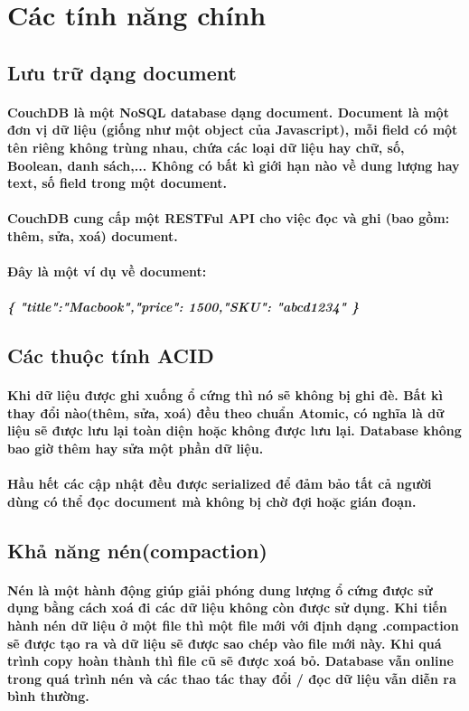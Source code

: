 	 \section{Các tính năng chính}
	  	\subsection{Lưu trữ dạng document}
	  	 	\paragraph{CouchDB là một NoSQL database dạng document. Document là một đơn vị dữ liệu (giống như một object của Javascript), mỗi field có một tên riêng không trùng nhau, chứa các loại dữ liệu hay chữ, số, Boolean, danh sách,... Không có bất kì giới hạn nào về dung lượng hay text, số field trong một document.}
	  	 	\paragraph{CouchDB cung cấp một RESTFul API cho việc đọc và ghi (bao gồm: thêm, sửa, xoá) document.} 
			\paragraph{Đây là một ví dụ về document:}
	  	 	\subparagraph{\{
	  	 		"title":"Macbook","price": 1500,"SKU": "abcd1234"  
	  	 		\} 
	  	 	}
	  	\subsection{Các thuộc tính ACID}
	  		\paragraph{Khi dữ liệu được ghi xuống ổ cứng thì nó sẽ không bị ghi đè. Bất kì thay đổi nào(thêm, sửa, xoá) đều theo chuẩn Atomic, có nghĩa là dữ liệu sẽ được lưu lại toàn diện hoặc không được lưu lại. Database không bao giờ thêm hay sửa một phần dữ liệu. }
			\paragraph{Hầu hết các cập nhật đều được serialized để đảm bảo tất cả người dùng có thể đọc document mà không bị chờ đợi hoặc gián đoạn.}
		\subsection{Khả năng nén(compaction)}
			\paragraph{Nén là một hành động giúp giải phóng dung lượng ổ cứng được sử dụng bằng cách xoá đi các dữ liệu không còn được sử dụng. Khi tiến hành nén dữ liệu ở một file thì một file mới với định dạng \textbf{.compaction} sẽ được tạo ra và dữ liệu sẽ được sao chép vào file mới này. Khi quá trình copy hoàn thành thì file cũ sẽ được xoá bỏ. Database vẫn online trong quá trình nén và các thao tác thay đổi / đọc dữ liệu vẫn diễn ra bình thường.}
